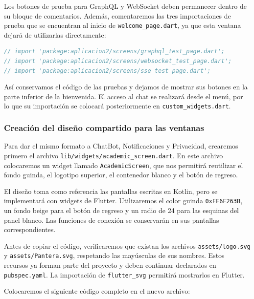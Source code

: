 Los botones de prueba para GraphQL y WebSocket deben permanecer dentro de su bloque de comentarios. Además, comentaremos las tres importaciones de prueba que se encuentran al inicio de \texttt{welcome\_page.dart}, ya que esta ventana dejará de utilizarlas directamente:

\begin{lstlisting}[language=Java, caption={Importaciones de prueba comentadas}]
// import 'package:aplicacion2/screens/graphql_test_page.dart';
// import 'package:aplicacion2/screens/websocket_test_page.dart';
// import 'package:aplicacion2/screens/sse_test_page.dart';
\end{lstlisting}

Así conservamos el código de las pruebas y dejamos de mostrar sus botones en la parte inferior de la bienvenida. El acceso al chat se realizará desde el menú, por lo que su importación se colocará posteriormente en \texttt{custom\_widgets.dart}.

\subsubsection{Creación del diseño compartido para las ventanas}
Para dar el mismo formato a ChatBot, Notificaciones y Privacidad, crearemos primero el archivo \texttt{lib/widgets/academic\_screen.dart}. En este archivo colocaremos un widget llamado \texttt{AcademicScreen}, que nos permitirá reutilizar el fondo guinda, el logotipo superior, el contenedor blanco y el botón de regreso.

El diseño toma como referencia las pantallas escritas en Kotlin, pero se implementará con widgets de Flutter. Utilizaremos el color guinda \texttt{0xFF6F263B}, un fondo beige para el botón de regreso y un radio de 24 para las esquinas del panel blanco. Las funciones de conexión se conservarán en sus pantallas correspondientes.

Antes de copiar el código, verificaremos que existan los archivos \texttt{assets/logo.svg} y \texttt{assets/Pantera.svg}, respetando las mayúsculas de sus nombres. Estos recursos ya forman parte del proyecto y deben continuar declarados en \texttt{pubspec.yaml}. La importación de \texttt{flutter\_svg} permitirá mostrarlos en Flutter.

Colocaremos el siguiente código completo en el nuevo archivo:

